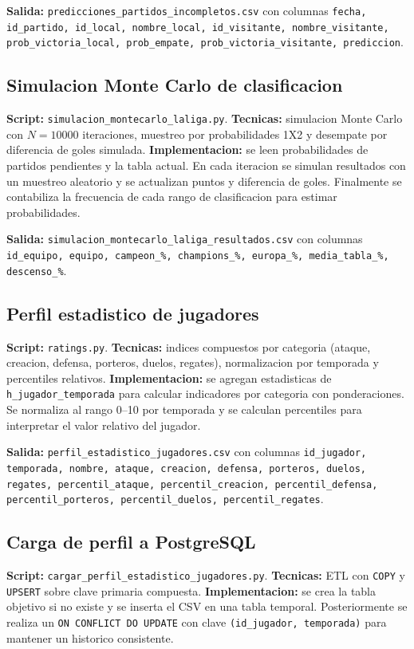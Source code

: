 \textbf{Salida:} \texttt{predicciones\_partidos\_incompletos.csv} con columnas \texttt{fecha, id\_partido, id\_local, nombre\_local, id\_visitante, nombre\_visitante, prob\_victoria\_local, prob\_empate, prob\_victoria\_visitante, prediccion}.

\subsection{Simulacion Monte Carlo de clasificacion}
\textbf{Script:} \texttt{simulacion\_montecarlo\_laliga.py}.\newline
\textbf{Tecnicas:} simulacion Monte Carlo con $N=10000$ iteraciones, muestreo por probabilidades 1X2 y desempate por diferencia de goles simulada.\newline
\textbf{Implementacion:} se leen probabilidades de partidos pendientes y la tabla actual. En cada iteracion se simulan resultados con un muestreo aleatorio y se actualizan puntos y diferencia de goles. Finalmente se contabiliza la frecuencia de cada rango de clasificacion para estimar probabilidades.

\textbf{Salida:} \texttt{simulacion\_montecarlo\_laliga\_resultados.csv} con columnas \texttt{id\_equipo, equipo, campeon\_\%, champions\_\%, europa\_\%, media\_tabla\_\%, descenso\_\%}.

\subsection{Perfil estadistico de jugadores}
\textbf{Script:} \texttt{ratings.py}.\newline
\textbf{Tecnicas:} indices compuestos por categoria (ataque, creacion, defensa, porteros, duelos, regates), normalizacion por temporada y percentiles relativos.\newline
\textbf{Implementacion:} se agregan estadisticas de \texttt{h\_jugador\_temporada} para calcular indicadores por categoria con ponderaciones. Se normaliza al rango 0--10 por temporada y se calculan percentiles para interpretar el valor relativo del jugador.

\textbf{Salida:} \texttt{perfil\_estadistico\_jugadores.csv} con columnas \texttt{id\_jugador, temporada, nombre, ataque, creacion, defensa, porteros, duelos, regates, percentil\_ataque, percentil\_creacion, percentil\_defensa, percentil\_porteros, percentil\_duelos, percentil\_regates}.

\subsection{Carga de perfil a PostgreSQL}
\textbf{Script:} \texttt{cargar\_perfil\_estadistico\_jugadores.py}.\newline
\textbf{Tecnicas:} ETL con \texttt{COPY} y \texttt{UPSERT} sobre clave primaria compuesta.\newline
\textbf{Implementacion:} se crea la tabla objetivo si no existe y se inserta el CSV en una tabla temporal. Posteriormente se realiza un \texttt{ON CONFLICT DO UPDATE} con clave \texttt{(id\_jugador, temporada)} para mantener un historico consistente.

